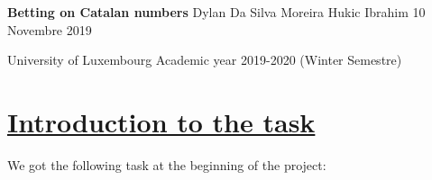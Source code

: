 \documentclass[a4paper,12pt,oneside]{article}
\begin{document}
 
\begin{titlepage}
\begin{center}
\vspace{10cm}
\hspace{0.5cm}
\newline
\Huge{\textbf{Betting on Catalan numbers}}
\vspace{1cm}
\newline 
\Large{\hspace{-2cm} Dylan Da Silva Moreira \hspace{3cm} Hukic Ibrahim}
\vspace{1cm}
\newline
\hspace{4cm} 10 Novembre 2019
\vspace{\fill}

\hspace{3cm}
\newline
University of Luxembourg
\vspace{0.5cm}
\newline
Academic year 2019-2020 (Winter Semestre)
\end{center}
\end{titlepage}
\newpage
\section{\underline{Introduction to the task}}
We got the following task at the beginning of the project:
\end{document}

